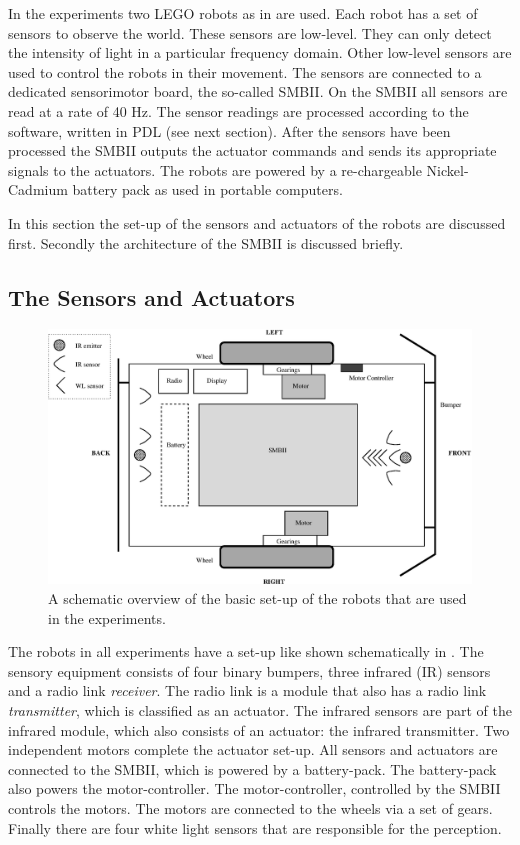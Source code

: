 In the experiments two LEGO robots as in  are used. Each robot has a set of sensors to observe the world. These sensors are low-level. They can only detect the intensity of light in a particular frequency domain. Other low-level sensors are used to control the robots in their movement. The sensors are connected to a dedicated sensorimotor board, the so-called SMBII. On the SMBII all sensors are read at a rate of 40 Hz. The sensor readings are processed according to the software, written in PDL (see next section). After the sensors have been processed the SMBII outputs the actuator commands and sends its appropriate signals to the actuators. The robots are powered by a re-chargeable Nickel-Cadmium battery pack as used in portable computers.

In this section the set-up of the sensors and actuators of the robots are discussed first. Secondly the architecture of the SMBII is discussed briefly.

\subsection{The Sensors and Actuators}\label{s:robots:sensors}

\begin{figure}[t]
\centerline{\includegraphics[width=12cm]{robots//schema_robots_exp2.eps}}
\caption{A schematic overview of the basic set-up of the robots that are used in the experiments.}
\label{f:robots:robots_general}
\end{figure}

The robots in all experiments have a set-up like shown schematically in . The sensory equipment consists of four binary bumpers, three infrared (IR) sensors and a radio link {\em receiver}. The radio link is a module that also has a radio link {\em transmitter}, which is classified as an actuator. The infrared sensors are part of the infrared module, which also consists of an actuator: the infrared transmitter. Two independent motors complete the actuator set-up. All sensors and actuators are connected to the SMBII, which is powered by a battery-pack. The battery-pack also powers the motor-controller. The motor-controller, controlled by the SMBII controls the motors. The motors are connected to the wheels via a set of gears. Finally there are four white light sensors that are responsible for the perception.

